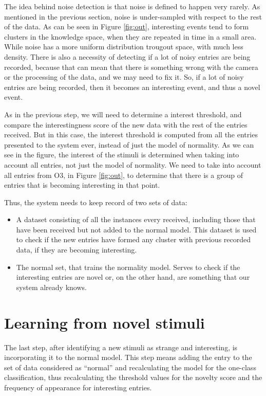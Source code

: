 The idea behind noise detection is that noise is defined to happen very rarely. As mentioned in the previous section, noise is under-sampled with respect to the rest of the data. As can be seen in Figure \ref{fig:out}, interesting events tend to form clusters in the knowledge space, when they are repeated in time in a small area. While noise has a more uniform distribution trougout space, with much less density. There is also a necessity of detecting if a lot of noisy entries are being recorded, because that can mean that there is something wrong with the camera or the processing of the data, and we may need to fix it. So, if a lot of noisy entries are being recorded, then it becomes an interesting event, and thus a novel event. 

As in the previous step, we will need to determine a interest threshold, and compare the interestingness score of the new data with the rest of the entries received. But in this case, the interest threshold is computed from all the entries presented to the system ever, instead of just the model of normality. As we can see in the figure, the interest of the stimuli is determined when taking into account all entries, not just the model of normality. We need to take into account all entries from O3, in Figure \ref{fig:out}, to determine that there is a group of entries that is becoming interesting in that point.  

Thus, the system needs to keep record of two sets of data:

\begin{itemize}

\item A dataset consisting of all the instances every received, including those that have been received but not added to the normal model. This dataset is used to check if the new entries have formed any cluster with previous recorded data, if they are becoming interesting.

\item The normal set, that trains the normality model. Serves to check if the interesting entries are novel or, on the other hand, are something that our system already knows.

\end{itemize}

\section{Learning from novel stimuli}

The last step, after identifying a new stimuli as strange and interesting, is incorporating it to the normal model. This step means adding the entry to the set of data considered as “normal” and recalculating the model for the one-class classification, thus recalculating the threshold values for the novelty score and the frequency of appearance for interesting entries.

